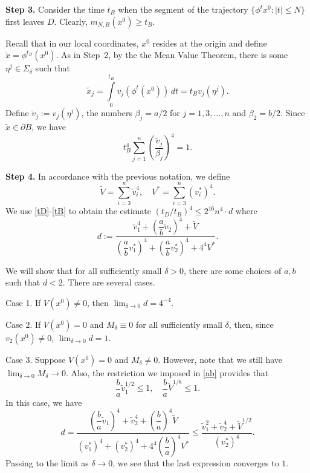 \begin{pf}
{\bf Step 3.} Consider the time  $t_B$  when
the segment of the trajectory $\{\phi^tx^0: |t|\leq N\}$ first
leaves  $D$. Clearly, $m_{N,B}(x^0)\geq t_B$.

Recall that in our local coordinates, $x^0$ resides
at the origin and  define $\tilde{x}=\phi^{t_B}(x^0)$.
As in Step~2,  by the the Mean Value Theorem,
there is some $\eta^j\in\Sigma_\delta$ such that
$$
\tilde{x}_j=\int\limits_0^{t_B}v_j(\phi^t(x^0))\,dt=
t_Bv_j(\eta^j).
$$
Define  $\tilde{v}_j:=v_j(\eta^j)$, the numbers
$\beta_j=a/2$ for $j=1,3,\dots, n$ and $\beta_2=b/2$.
Since $\tilde{x}\in\partial B$, we have
\begin{equation}\label{tB}
t^4_B \sum_{j=1}^n\left(\dfrac{\tilde{v}_j}{\beta_j}\right)^4=1.
\end{equation}

{\bf Step 4.}
In accordance with the previous notation, we define
$$
\tilde{V}=\sum_{i=3}^n\tilde{v}^4_i,\quad
V^*=\sum_{i=3}^n\left(v^*_i\right)^4.
$$
We use \eqref{tD}-\eqref{tB} to obtain the estimate
$(t_D/t_B)^4\leq 2^{16} n^4\cdot d$ where
$$
d:=\dfrac{\tilde{v}_1^4+\left(\dfrac{a}{b}\tilde{v}_2\right)^4+
\tilde{V}}{\left(\dfrac{a}{b}v^*_1\right)^4+
\left(\dfrac{a}{b}v^*_2\right)^4+4^4 V^*}.
$$

We will show that for all sufficiently small $\delta>0$,
there are some choices of  $a,b$ such that $d<2$.
There are several cases.

Case 1. If $V(x^0)\neq 0$, then $\lim_{\delta\to 0}d= 4^{-4}$.

Case 2. If $V(x^0)= 0$ and
$M_\delta\equiv 0$ for all sufficiently
small $\delta$,
then, since $v_2(x^0)\neq 0$, $\lim_{\delta\to 0}d= 1$.

Case 3. Suppose  $V(x^0)= 0$ and $M_\delta\neq 0$. However, note
that we still have
$\lim_{\delta\to 0}M_\delta\to 0$.
Also, the restriction we imposed in \eqref{ab} provides that
\[
\dfrac{b}{a}\tilde{v}_1^{1/2}\leq 1,\quad
\dfrac{b}{a}\tilde{V}^{1/8}\leq 1.
\]
In this case, we have
\begin{equation*}
d  = \dfrac{
\left(\dfrac{b}{a}\tilde{v}_1\right)^4
+\tilde{v}_2^4+\left(\dfrac{b}{a}\right)^4\tilde{V}}
{\left(v_1^*\right)^4+\left(v_2^*\right)^4+
4^4\left(\dfrac{b}{a}\right)^4V^* }
 \leq
\dfrac{
\tilde{v}_1^2+\tilde{v}_2^4+\tilde{V}^{1/2} } {({v}_2^*)^4}.
\end{equation*}
Passing to the limit as $\delta\to 0$, we see that
the last expression converges to $1$.
\end{pf}

